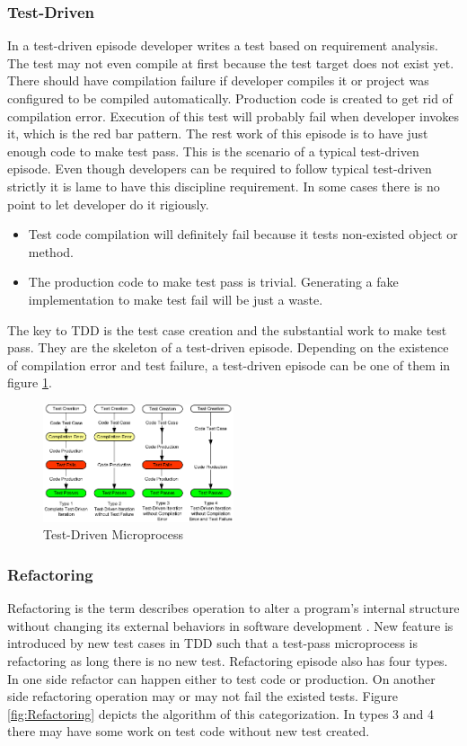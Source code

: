 \documentclass[11pt,twocolumn]{article}
\begin{document}
\subsubsection{Test-Driven}
In a test-driven episode developer writes a test based on requirement
analysis. The test may not even compile at first because the test target
does not exist yet. There should have compilation failure if developer
compiles it or project was configured to be compiled automatically.
Production code is created to get rid of compilation error.  Execution of
this test will probably fail when developer invokes it, which is the red
bar pattern. The rest work of this episode is to have just enough code to
make test pass. This is the scenario of a typical test-driven episode. Even
though developers can be required to follow typical test-driven strictly it
is lame to have this discipline requirement. In some cases there is no
point to let developer do it rigiously.
\begin{itemize}
\item Test code compilation will definitely fail because it tests
  non-existed object or method.
\item The production code to make test pass is trivial. Generating a fake
  implementation to make test fail will be just a waste.
\end{itemize}

The key to TDD is the test case creation and the substantial work to make
test pass. They are the skeleton of a test-driven episode. Depending on the
existence of compilation error and test failure, a test-driven episode can
be one of them in figure \ref{fig:Test-Driven}.

\begin{figure}[ht] 
  \centering
  \includegraphics[width=0.5\textwidth]{picture/TDD-Microprocess.eps}
  \caption{Test-Driven Microprocess}\label{fig:Test-Driven}
\end{figure}

\subsubsection{Refactoring}
Refactoring is the term describes operation to alter a program's internal
structure without changing its external behaviors in software development
\cite{Refactoring}. New feature is introduced by new test cases in TDD such
that a test-pass microprocess is refactoring as long there is no new test.
Refactoring episode also has four types. In one side refactor can happen
either to test code or production. On another side refactoring operation
may or may not fail the existed tests. Figure \ref{fig:Refactoring} depicts
the algorithm of this categorization. In types 3 and 4 there may have some
work on test code without new test created.
\end{document}
